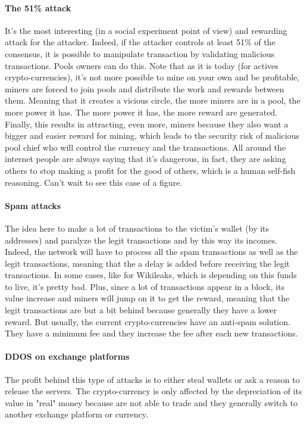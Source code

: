 \paragraph{The 51\% attack}
It's the most interesting (in a social experiment point of view) and rewarding attack for the attacker. Indeed, if the attacker controls at least 51\% of the consensus, it is possible to manipulate transaction by validating malicious transactions. Pools owners can do this. Note that as it is today (for actives crypto-currencies), it's not more possible to mine on your own and be profitable, miners are forced to join pools and distribute the work and rewards between them. Meaning that it creates a vicious circle, the more miners are in a pool, the more power it has. The more power it has, the more reward are generated. Finally, this results in attracting, even more, miners because they also want a bigger and easier reward for mining, which leads to the security risk of malicious pool chief who will control the currency and the transactions. All around the internet people are always saying that it's dangerous, in fact, they are asking others to stop making a profit for the good of others, which is a human self-fish reasoning. Can't wait to see this case of a figure.

\paragraph{Spam attacks}
The idea here to make a lot of transactions to the victim's wallet (by its addresses) and paralyze the legit transactions and by this way its incomes. Indeed, the network will have to process all the spam transactions as well as the legit transactions, meaning that the a delay is added before receiving the legit transactions. In some cases, like for Wikileaks\cite{TheBitcoinNews2015BitcoinAttacks}, which is depending on this funds to live, it's pretty bad. Plus, since a lot of transactions appear in a block, its value increase and miners will jump on it to get the reward, meaning that the legit transactions are but a bit behind because generally they have a lower reward. But usually, the current crypto-currencies have an anti-spam solution. They have a minimum fee and they increase the fee after each new transactions.

\paragraph{DDOS on exchange platforms}
The profit behind this type of attacks is to either steal wallets or ask a reason to release the servers. The crypto-currency is only affected by the depreciation of its value in "real" money because are not able to trade and they generally switch to another exchange platform or currency.

